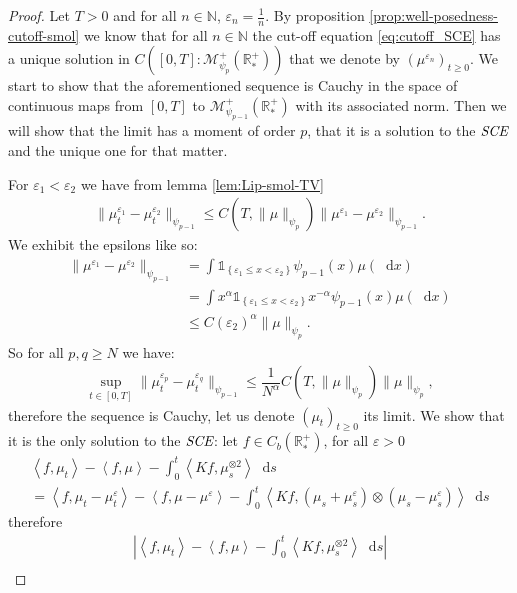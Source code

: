 \documentclass[11pt,a4paper]{article}
\newcommand{\NN}{\mathbb{N}}
\newcommand{\RRP}{\mathbb{R}^+_*}
\newcommand{\MC}{\mathcal{M}}
\newcommand{\SCE}{\emph{SCE}}
\newcommand{\Proc}[1]{\left(#1\right)_{t\geq 0}}
\newcommand{\indic}[1]{\mathds{1}_{\left\lbrace#1\right\rbrace}}
\newcommand{\brac}[1]{\left\langle#1\right\rangle}
\newcommand{\dd}{\mathop{}\!\mathrm{d}}
\begin{document}
\begin{proof}
    Let $T > 0$ and for all $n\in \NN$, $\varepsilon_n = \frac1n$. By proposition \ref{prop:well-posedness-cutoff-smol} we know that for all $n \in \NN$ the cut-off equation \eqref{eq:cutoff_SCE} has a unique solution in $C\left([0,T]: \MC_{\psi_{p}}^+ (\RRP)\right)$ that we denote by $\Proc{\mu^{\varepsilon_n}}$. We start to show that the aforementioned sequence is Cauchy in the space of continuous maps from $[0,T]$ to $\MC_{\psi_{p-1}}^+ (\RRP)$ with its associated norm. Then we will show that the limit has a moment of order $p$, that it is a solution to the $\SCE$ and the unique one for that matter.
    
    For $\varepsilon_1 < \varepsilon_2$ we have from lemma \ref{lem:Lip-smol-TV} 
    \begin{align*}
        \| \mu_t^{\varepsilon_1}- \mu_t^{\varepsilon_2}\|_{\psi_{p-1}} \leq C(T,\|\mu\|_{\psi_{p}}) \| \mu^{\varepsilon_1}- \mu^{\varepsilon_2}\|_{\psi_{p-1}}.
    \end{align*}
    We exhibit the epsilons like so:
    \begin{align*}
        \| \mu^{\varepsilon_1}- \mu^{\varepsilon_2}\|_{\psi_{p-1}} &= \int\indic{\varepsilon_1 \leq x < \varepsilon_2} \psi_{p-1}(x)\mu(\dd x)\\
        &= \int x^{\alpha} \indic{\varepsilon_1 \leq x < \varepsilon_2} x^{-\alpha}\psi_{p-1}(x)\mu(\dd x)\\
        &\leq C(\varepsilon_2)^\alpha \|\mu\|_{\psi_{p}}.
    \end{align*}
    So for all $p,q \geq N$ we have:
    \begin{align*}
        \sup\limits_{t \in [0,T]} \| \mu_t^{\varepsilon_p}- \mu_t^{\varepsilon_q}\|_{\psi_{p-1}} \leq \dfrac{1}{N^\alpha} C(T,\|\mu\|_{\psi_{p}}) \| \mu\|_{\psi_p},
    \end{align*}
    therefore the sequence is Cauchy, let us denote $\Proc{\mu_t}$ its limit. We show that it is the only solution to the $\SCE$: let $f \in C_b(\RRP)$, for all $\varepsilon > 0$
    \begin{multline*}
        \brac{f,\mu_t} - \brac{f,\mu} - \int_0^t\brac{Kf,\mu_s^{\otimes 2}}\dd s \\
        = \brac{f,\mu_t-\mu_t^\varepsilon} - \brac{f,\mu-\mu^\varepsilon} - \int_0^t\brac{Kf,(\mu_s+ \mu^\varepsilon_s)\otimes (\mu_s - \mu^\varepsilon_s)}\dd s
    \end{multline*}
    therefore
    \begin{multline*}
        \left|\brac{f,\mu_t} - \brac{f,\mu} - \int_0^t\brac{Kf,\mu_s^{\otimes 2}}\dd s\right|\\

\end{multline*}
\end{proof}
\end{document}
